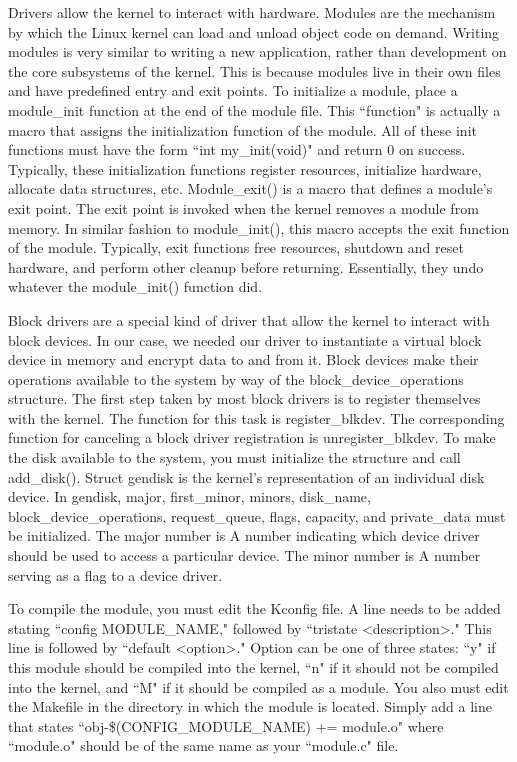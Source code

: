 \documentclass[letterpaper,10pt,titlepage]{article}
\newcommand{\ignore}[2]{\hspace{0in}#2} %
\newcommand{\tab}{\hspace*{2em}} %
\begin{document}
\begin{enumerate}
\tab Drivers allow the kernel to interact with hardware. Modules are the mechanism by which the Linux kernel can load and unload object code on demand. Writing modules is very similar to writing a new application, rather than development on the core subsystems of the kernel. This is because modules live in their own files and have predefined entry and exit points. To initialize a module, place a module\_init function at the end of the module file. This ``function" is actually a macro that assigns the initialization function of the module. All of these init functions must have the form ``int my_init(void)" and return 0 on success. Typically, these initialization functions register resources, initialize hardware, allocate data structures, etc. Module\_exit() is a macro that defines a module's exit point. The exit point is invoked when the kernel removes a module from memory. In similar fashion to module\_init(), this macro accepts the exit function of the module. Typically, exit functions free resources, shutdown and reset hardware, and perform other cleanup before returning. Essentially, they undo whatever the module\_init() function did\ignore{source: Love, pg 339}. 

\tab Block drivers are a special kind of driver that allow the kernel to interact with block devices. In our case, we needed our driver to instantiate a virtual block device in memory and encrypt data to and from it. Block devices make their operations available to the system by way of the block_device_operations structure. The first step taken by most block drivers is to register themselves with the kernel. The function for this task is register_blkdev. The corresponding function for canceling a block driver registration is unregister_blkdev. To make the disk available to the system, you must initialize the structure and call add\_disk(). Struct gendisk is the kernel's representation of an individual disk device. In gendisk, major, first\_minor, minors, disk\_name, block\_device\_operations, request\_queue, flags, capacity, and private\_data must be initialized\ignore{source: http://www.makelinux.net/ldd3/chp-16-sect-1}. The major number is A number indicating which device driver should be used to access a particular device. The minor number is A number serving as a flag to a device driver\ignore{source: http://www.linux-tutorial.info/modules.php?name=MContent&obj=glossary}. 

\tab To compile the module, you must edit the Kconfig file. A line needs to be added stating ``config MODULE_NAME," followed by ``tristate <description>." This line is followed by ``default <option>." Option can be one of three states: ``y" if this module should be compiled into the kernel, ``n" if it should not be compiled into the kernel, and ``M" if it should be compiled as a module. You also must edit the Makefile in the directory in which the module is located. Simply add a line that states ``obj-\$(CONFIG_MODULE_NAME) += module.o" where ``module.o" should be of the same name as your ``module.c" file.


\end{enumerate}
\end{document}

